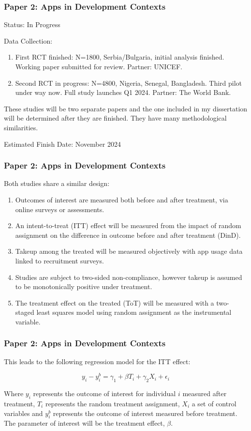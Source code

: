 \documentclass[aspectratio=169]{beamer}
\begin{document}
\begin{frame}
\frametitle{Paper 2: Apps in Development Contexts}

Status: In Progress

Data Collection: 
\begin{enumerate}
\item First RCT finished: N=1800, Serbia/Bulgaria, initial analysis finished. Working paper submitted for review. Partner: UNICEF.
\item Second RCT in progress: N=4800, Nigeria, Senegal, Bangladesh. Third pilot under way now. Full study launches Q1 2024. Partner: The World Bank. 
\end{enumerate}

These studies will be two separate papers and the one included in my dissertation will be determined after they are finished. They have many methodological similarities. 

Estimated Finish Date: November 2024



\end{frame}

\begin{frame}
\frametitle{Paper 2: Apps in Development Contexts}

Both studies share a similar design: 

\begin{enumerate}
\item Outcomes of interest are measured both before and after treatment, via online surveys or assessments. 
\item An intent-to-treat (ITT) effect will be measured from the impact of random assignment on the difference in outcome before and after treatment (DinD). 
\item Takeup among the treated will be measured objectively with app usage data linked to recruitment surveys. 
\item Studies are subject to two-sided non-compliance, however takeup is assumed to be monotonically positive under treatment. 
\item The treatment effect on the treated (ToT) will be measured with a two-staged least squares model using random assignment as the instrumental variable.  
\end{enumerate}

\end{frame}


\begin{frame}
\frametitle{Paper 2: Apps in Development Contexts}

This leads to the following regression model for the ITT effect:

$$
y_{i} - y^{b}_i = \gamma_1 + \beta T_{i} + \gamma_2X_{i} + \epsilon_i
$$

Where $y_i$ represents the outcome of interest for individual $i$ measured after treatment, $T_i$ represents the random treatment assignment, $X_i$ a set of control variables and $y^b_i$ represents the outcome of interest measured before treatment. The parameter of interest will be the treatment effect, $\beta$. 

\end{frame}
\end{document}
